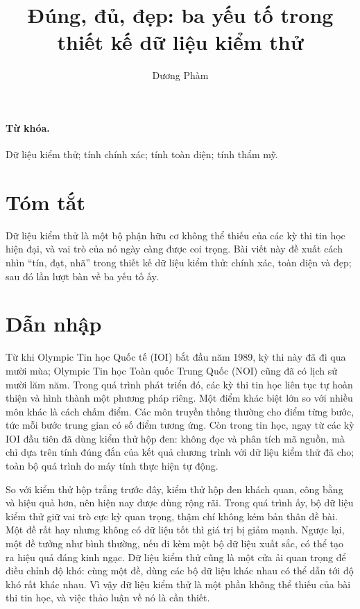 \documentclass[11pt]{article}
\title{Đúng, đủ, đẹp: ba yếu tố trong thiết kế dữ liệu kiểm thử}
\author{Dương Phàm}
\date{}
\begin{document}
\maketitle


\paragraph{Từ khóa.}
Dữ liệu kiểm thử; tính chính xác; tính toàn diện; tính thẩm mỹ.

\section*{Tóm tắt}

Dữ liệu kiểm thử là một bộ phận hữu cơ không thể thiếu của các kỳ thi tin học
hiện đại, và vai trò của nó ngày càng được coi trọng. Bài viết này đề xuất
cách nhìn ``tín, đạt, nhã'' trong thiết kế dữ liệu kiểm thử: chính xác, toàn
diện và đẹp; sau đó lần lượt bàn về ba yếu tố ấy.

\section{Dẫn nhập}

Từ khi Olympic Tin học Quốc tế (IOI) bắt đầu năm 1989, kỳ thi này đã đi qua
mười mùa; Olympic Tin học Toàn quốc Trung Quốc (NOI) cũng đã có lịch sử mười
lăm năm. Trong quá trình phát triển đó, các kỳ thi tin học liên tục tự hoàn
thiện và hình thành một phương pháp riêng. Một điểm khác biệt lớn so với nhiều
môn khác là cách chấm điểm. Các môn truyền thống thường cho điểm từng bước,
tức mỗi bước trung gian có số điểm tương ứng. Còn trong tin học, ngay từ các
kỳ IOI đầu tiên đã dùng kiểm thử hộp đen: không đọc và phân tích mã nguồn, mà
chỉ dựa trên tính đúng đắn của kết quả chương trình với dữ liệu kiểm thử đã
cho; toàn bộ quá trình do máy tính thực hiện tự động.

So với kiểm thử hộp trắng trước đây, kiểm thử hộp đen khách quan, công bằng và
hiệu quả hơn, nên hiện nay được dùng rộng rãi. Trong quá trình ấy, bộ dữ liệu
kiểm thử giữ vai trò cực kỳ quan trọng, thậm chí không kém bản thân đề bài.
Một đề rất hay nhưng không có dữ liệu tốt thì giá trị bị giảm mạnh. Ngược lại,
một đề tưởng như bình thường, nếu đi kèm một bộ dữ liệu xuất sắc, có thể tạo
ra hiệu quả đáng kinh ngạc. Dữ liệu kiểm thử cũng là một cửa ải quan trọng để
điều chỉnh độ khó: cùng một đề, dùng các bộ dữ liệu khác nhau có thể dẫn tới
độ khó rất khác nhau. Vì vậy dữ liệu kiểm thử là một phần không thể thiếu của
bài thi tin học, và việc thảo luận về nó là cần thiết.
\end{document}
